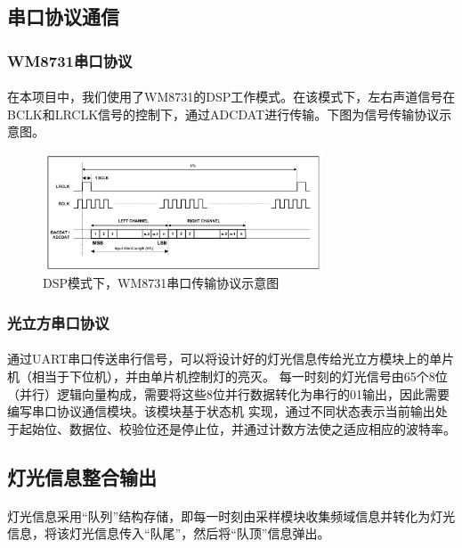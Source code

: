 \documentclass[12pt]{article}
\begin{document}
\subsection{串口协议通信}
\subsubsection{WM8731串口协议}
\paragraph{}
在本项目中，我们使用了WM8731的DSP工作模式。在该模式下，左右声道信号在BCLK和LRCLK信号的控制下，通过ADCDAT进行传输。下图为信号传输协议示意图。

\begin{figure}[h]
    \centering
    \label{dsp}
        \includegraphics[width=0.74\textwidth]{./pic/dsp.png}
        \caption{DSP模式下，WM8731串口传输协议示意图}
\end{figure}

\subsubsection{光立方串口协议}
\paragraph{}通过UART串口传送串行信号，可以将设计好的灯光信息传给光立方模块上的单片机（相当于下位机），并由单片机控制灯的亮灭。
每一时刻的灯光信号由65个8位（并行）逻辑向量构成，需要将这些8位并行数据转化为串行的01输出，因此需要编写串口协议通信模块。该模块基于状态机
实现，通过不同状态表示当前输出处于起始位、数据位、校验位还是停止位，并通过计数方法使之适应相应的波特率。

\subsection{灯光信息整合输出}
\paragraph{}灯光信息采用“队列”结构存储，即每一时刻由采样模块收集频域信息并转化为灯光信息，将该灯光信息传入“队尾”，然后将“队顶”信息弹出。
\end{document}
